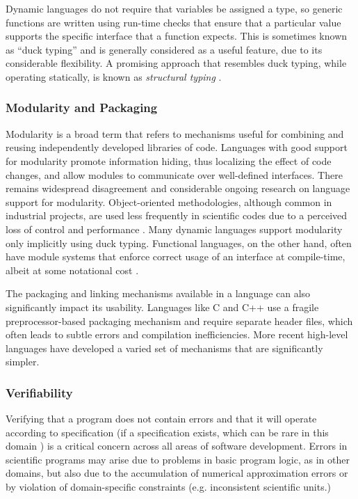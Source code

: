 \documentclass{llncs}
\begin{document}
Dynamic languages do not require that variables be assigned a type, so generic functions are written using run-time checks that ensure that a particular value supports the specific interface that a function expects. This is sometimes known as ``duck typing'' and is generally considered as a useful feature, due to its considerable flexibility. A promising approach that resembles duck typing, while operating statically, is known as {\it structural typing} \cite{malayeri2009structural}.

\subsubsection{Modularity and Packaging}\label{modularity}
Modularity is a broad term that refers to mechanisms useful for combining and reusing independently developed libraries of code. Languages with good support for modularity promote information hiding, thus localizing the effect of code changes, and allow modules to communicate over well-defined interfaces. There remains widespread disagreement and considerable ongoing research on language support for modularity. Object-oriented methodologies, although common in industrial projects, are used less frequently in scientific codes due to a perceived loss of control and performance \cite{basili2008understanding}. Many dynamic languages support modularity only implicitly using duck typing. Functional languages, on the other hand, often have module systems that enforce correct usage of an interface at compile-time, albeit at some notational cost \cite{tapl}.

The packaging and linking mechanisms available in a language can also significantly impact its usability. Languages like C and C++ use a fragile preprocessor-based packaging mechanism and require separate header files, which often leads to subtle errors and compilation inefficiencies. More recent high-level languages have developed a varied set of mechanisms that are significantly simpler.

\subsubsection{Verifiability}\label{verifiability}
Verifying that a program does not contain errors and that it will operate according to specification (if a specification exists, which can be rare in this domain \cite{oai:open.ac.uk.OAI2:17673}) is a critical concern across all areas of software development. Errors in scientific programs may arise due to problems in basic program logic, as in other domains, but also due to the accumulation of  numerical approximation errors or by violation of domain-specific constraints (e.g. inconsistent scientific units.)
\end{document}
